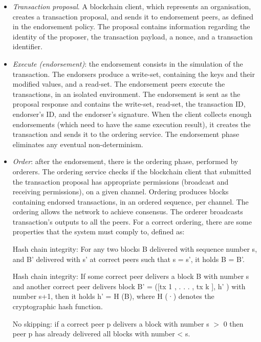 \documentclass[12pt,a4paper]{article}
\theoremstyle{definition}
\begin{document}
\begin{itemize}
    \item \emph{Transaction proposal}. A blockchain client, which represents an organisation, creates a transaction proposal, and sends it to endorsement peers, as defined in the endorsement policy. The proposal contains information regarding the identity of the proposer, the transaction payload, a nonce, and a transaction identifier.
    \item \emph{{Execute} (endorsement)}: the endorsement consists in the simulation of the transaction. The endorsers produce a write-set,  containing the keys and their modified values, and a read-set.  The endorsement peers execute the transactions, in an isolated environment. The endorsement is sent as the proposal response and contains the write-set, read-set, the transaction ID, endorser's ID, and the endorser's signature. When the client collects enough endorsements (which need to have the same execution result), it creates the transaction and sends it to the ordering service. The endorsement phase eliminates any eventual non-determinism.

\item \emph{{Order}}: after the endorsement, there is the ordering phase, performed by orderers. The ordering service checks if the blockchain client that submitted the transaction proposal has appropriate permissions (broadcast and receiving permissions), on a given channel. Ordering produces blocks containing endorsed transactions, in an ordered sequence, per channel. The ordering allows the network to achieve consensus. The orderer broadcasts transaction's outputs to all the peers. For a correct ordering, there are some properties that the system must comply to, defined as:
    
     \begin{mydef}{Hash chain integrity:}
    For any two blocks B delivered with sequence number s, and B' delivered with s' at correct peers such that s = s',
    it holds B = B'.
    \end{mydef}

    \begin{mydef}{Hash chain integrity:}
    If some correct peer delivers a block B
with number s and another correct peer delivers block B' =
([tx 1 , . . . , tx k ], h' ) with number s+1, then it holds h' = H (B),
where H (·) denotes the cryptographic hash function.
    \end{mydef}
    
    \begin{mydef}{No skipping:}
if a correct peer p delivers a block with number s $>$ 0
then peer p has already delivered all blocks with number < s.
    \end{mydef}
    

\end{itemize}
\end{document}
